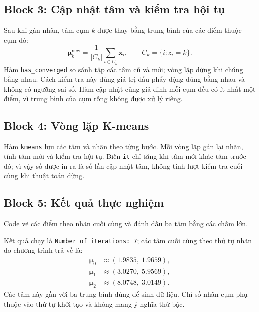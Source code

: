 

\subsection{Block 3: Cập nhật tâm và kiểm tra hội tụ}

Sau khi gán nhãn, tâm cụm $k$ được thay bằng trung bình của các điểm thuộc
cụm đó:
\begin{equation}
    \boldsymbol{\mu}_k^{\mathrm{new}}=
    \frac{1}{|C_k|}\sum_{i\in C_k}\mathbf{x}_i,
    \qquad C_k=\{i:z_i=k\}.
\end{equation}
Hàm \texttt{has\_converged} so sánh tập các tâm cũ và mới; vòng lặp dừng
khi chúng bằng nhau. Cách kiểm tra này dùng giá trị dấu phẩy động đúng bằng
nhau và không có ngưỡng sai số. Hàm cập nhật cũng giả định mỗi cụm đều có
ít nhất một điểm, vì trung bình của cụm rỗng không được xử lý riêng.



\subsection{Block 4: Vòng lặp K-means}

Hàm \texttt{kmeans} lưu các tâm và nhãn theo từng bước. Mỗi vòng lặp gán lại
nhãn, tính tâm mới và kiểm tra hội tụ. Biến \texttt{it} chỉ tăng khi tâm mới
khác tâm trước đó; vì vậy số được in ra là số lần cập nhật tâm, không tính
lượt kiểm tra cuối cùng khi thuật toán dừng.



\subsection{Block 5: Kết quả thực nghiệm}

Code vẽ các điểm theo nhãn cuối cùng và đánh dấu ba tâm bằng các
chấm lớn. 

Kết quả chạy là
\texttt{Number of iterations: 7}; các tâm cuối cùng theo thứ tự nhãn do
chương trình trả về là:
\begin{equation}
\begin{aligned}
    \boldsymbol{\mu}_0 &\approx (1.9835,\;1.9659),\\
    \boldsymbol{\mu}_1 &\approx (3.0270,\;5.9569),\\
    \boldsymbol{\mu}_2 &\approx (8.0748,\;3.0149).
\end{aligned}
\end{equation}
Các tâm này gần với ba trung bình dùng để sinh dữ liệu. Chỉ số nhãn cụm
phụ thuộc vào thứ tự khởi tạo và không mang ý nghĩa thứ bậc.

